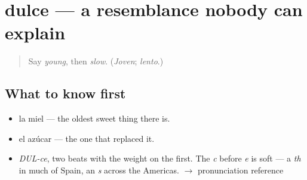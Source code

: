 \section[dulce]{dulce — a resemblance nobody can explain}

\label{lesson:ES-C371-dulce}



\begin{quote}
Say \emph{young}, then \emph{slow}. (\emph{Joven}; \emph{lento}.)
\end{quote}

\subsection*{What to know first}
\begin{itemize}
\raggedright
  \item la miel — the oldest sweet thing there is.
  \item el azúcar — the one that replaced it.
\end{itemize}

\begin{sounds}
\begin{itemize}
\raggedright
  \item \emph{DUL-ce}, two beats with the weight on the first. The \emph{c} before \emph{e} is soft — a \emph{th} in much of Spain, an \emph{s} across the Americas. $\to$ pronunciation reference
\end{itemize}
\end{sounds}

